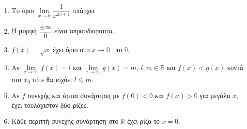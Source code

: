 \documentclass[11pt,a4paper]{article}
\begin{document}
\begin{enumerate}[label=\textbf{1.\arabic*.}]
    \item Το όριο $\lim\limits_{x\to 0}{\dfrac{1}{x^{2\nu+1}}}$ υπάρχει
    \item Η μορφή $\dfrac{\pm\infty}{0}$ είναι απροσδιοριστία.
    \item $f(x) = \sqrt{x}$ έχει όριο στο $x \to 0^-$ το 0.
    \item Αν $\lim\limits_{x\to x_0}{f(x)}=l$ και $\lim\limits_{x\to x_0}{g(x)}=m,\ l,m\in\mathbb{R}$ και $f(x)<g(x)$ κοντά στο $x_0$ τότε θα ισχύει $l\leq m$.
    \item Αν $f$ συνεχής και άρτια συνάρτηση με $f(0)<0$ και $f(x)>0$ για μεγάλα $x$, έχει τουλάχιστον δύο ρίζες.
    \item Κάθε περιττή συνεχής συνάρτηση στο $\mathbb{R}$ έχει ρίζα το $x=0$.
\end{enumerate}
\end{document}
